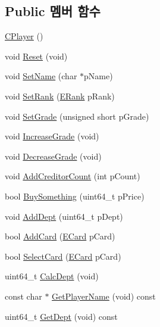 \subsection*{\-Public 멤버 함수}
\begin{DoxyCompactItemize}
\item 
\hyperlink{class_c_player_a931a59adf2ada5376122e30b33ae2c4c}{\-C\-Player} ()
\item 
void \hyperlink{class_c_player_acf628f08c81409913cb0833bb115cdb3}{\-Reset} (void)
\item 
void \hyperlink{class_c_player_a9913e32cb613756cc092eee3a5b51a2b}{\-Set\-Name} (char $\ast$p\-Name)
\item 
void \hyperlink{class_c_player_a51451db1a48869676883ad6f3f405d14}{\-Set\-Rank} (\hyperlink{_constants_8h_a4db5fb2e90acc4ef6c281d6cca4dea4e}{\-E\-Rank} p\-Rank)
\item 
void \hyperlink{class_c_player_ad57bf753f80586ec0f64c60e0c4ea0fb}{\-Set\-Grade} (unsigned short p\-Grade)
\item 
void \hyperlink{class_c_player_a57cbfab5dbea898e0f1e6d6ef59a299e}{\-Increase\-Grade} (void)
\item 
void \hyperlink{class_c_player_a0fc3b3c7cd8023dbbbdc2b882f0bb332}{\-Decrease\-Grade} (void)
\item 
void \hyperlink{class_c_player_a794b0017abea4805822cd7b45ad87a9b}{\-Add\-Creditor\-Count} (int p\-Count)
\item 
bool \hyperlink{class_c_player_a4649279fe3c5b1f48693f82d96d4f78d}{\-Buy\-Something} (uint64\-\_\-t p\-Price)
\item 
void \hyperlink{class_c_player_a8c6227c3a234b86be05de01cefb5523d}{\-Add\-Dept} (uint64\-\_\-t p\-Dept)
\item 
bool \hyperlink{class_c_player_a18b2124b5135497c522d83b42a003d9f}{\-Add\-Card} (\hyperlink{_constants_8h_a03f7ec9e12b891db1bbeda07eb4099d7}{\-E\-Card} p\-Card)
\item 
bool \hyperlink{class_c_player_ab5eb413c887a4054e7f596f0d579cd9f}{\-Select\-Card} (\hyperlink{_constants_8h_a03f7ec9e12b891db1bbeda07eb4099d7}{\-E\-Card} p\-Card)
\item 
uint64\-\_\-t \hyperlink{class_c_player_a5ab4c5d7ec31884412907a1bbdadad5c}{\-Calc\-Dept} (void)
\item 
const char $\ast$ \hyperlink{class_c_player_a5ae1229e6474d6cf7979d60bdcfbf889}{\-Get\-Player\-Name} (void) const 
\item 
uint64\-\_\-t \hyperlink{class_c_player_a5de57603460102d5ca5c0993d5e7355c}{\-Get\-Dept} (void) const 

\end{DoxyCompactItemize}

